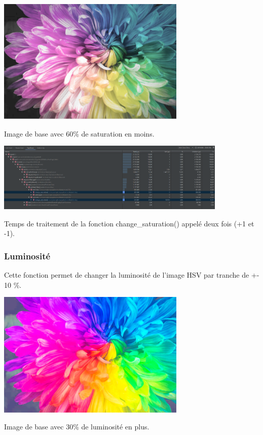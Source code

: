 \documentclass{article}
\begin{document}
\begin{center} 
    \includegraphics[width=9cm]{../Image_fonctions/SaturationMoins6}

    Image de base avec 60\% de saturation en moins.
\end{center}
\bigbreak

\begin{center} 
    \includegraphics[width=11cm]{../Image_temps/TempsChangeSaturation}

    Temps de traitement de la fonction change\_saturation() appelé deux fois (+1 et -1).
\end{center}
\bigbreak

\subsubsection{Luminosité}
Cette fonction permet de changer la luminosité de l'image HSV par tranche de +- 10 \%.
\bigbreak

\begin{center} 
    \includegraphics[width=9cm]{../Image_fonctions/LuminositePlus3}

    Image de base avec 30\% de luminosité en plus.
\end{center}
\bigbreak
\end{document}
